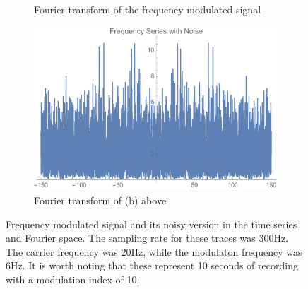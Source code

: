 \documentclass[onecolumn, groupedaddress, 10pt]{revtex4-1}
\begin{document}
\begin{figure}[H]
\begin{subfigure}{.5\textwidth}
  		\caption{\label{fig:results3} Fourier transform of the frequency modulated signal}
	\end{subfigure}%
	\begin{subfigure}{.5\textwidth}
  		\centering
  		\includegraphics[width=.9\linewidth]{fourierSeriesNoise.pdf}
  		\caption{\label{fig:results4} Fourier transform of (b) above}
	\end{subfigure}
	\caption{\label{fig:} Frequency modulated signal and its noisy version in the time series and Fourier space.  The sampling rate for these traces was 300Hz. The carrier frequency was 20Hz, while the modulaton frequency was 6Hz. It is worth noting that these represent 10 seconds of recording with a modulation index of 10.}
\end{figure}	
\end{document}
